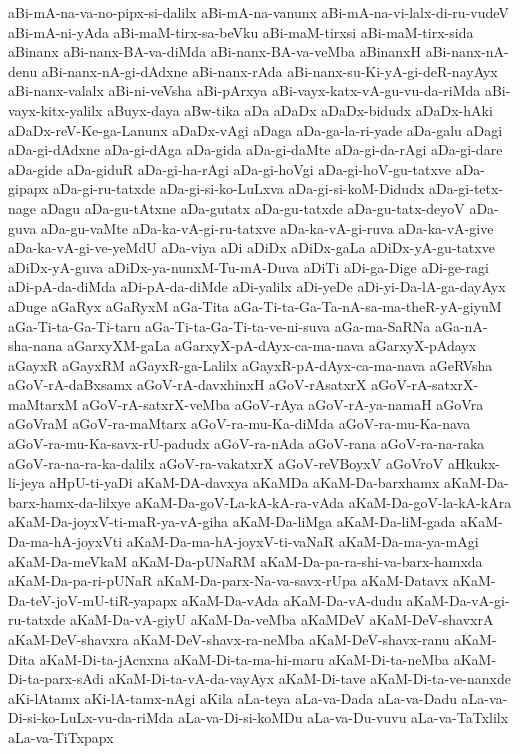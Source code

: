 {aBi-mA-na-va-no-pipx-si-dalilx
aBi-mA-na-vanunx
aBi-mA-na-vi-lalx-di-ru-vudeV
aBi-mA-ni-yAda
aBi-maM-tirx-sa-beVku
aBi-maM-tirxsi
aBi-maM-tirx-sida
aBinanx
aBi-nanx-BA-va-diMda
aBi-nanx-BA-va-veMba
aBinanxH
aBi-nanx-nA-denu
aBi-nanx-nA-gi-dAdxne
aBi-nanx-rAda
aBi-nanx-su-Ki-yA-gi-deR-nayAyx
aBi-nanx-valalx
aBi-ni-veVsha
aBi-pArxya
aBi-vayx-katx-vA-gu-vu-da-riMda
aBi-vayx-kitx-yalilx
aBuyx-daya
aBw-tika
aDa
aDaDx
aDaDx-bidudx
aDaDx-hAki
aDaDx-reV-Ke-ga-Lanunx
aDaDx-vAgi
aDaga
aDa-ga-la-ri-yade
aDa-galu
aDagi
aDa-gi-dAdxne
aDa-gi-dAga
aDa-gida
aDa-gi-daMte
aDa-gi-da-rAgi
aDa-gi-dare
aDa-gide
aDa-giduR
aDa-gi-ha-rAgi
aDa-gi-hoVgi
aDa-gi-hoV-gu-tatxve
aDa-gipapx
aDa-gi-ru-tatxde
aDa-gi-si-ko-LuLxva
aDa-gi-si-koM-Didudx
aDa-gi-tetx-nage
aDagu
aDa-gu-tAtxne
aDa-gutatx
aDa-gu-tatxde
aDa-gu-tatx-deyoV
aDa-guva
aDa-gu-vaMte
aDa-ka-vA-gi-ru-tatxve
aDa-ka-vA-gi-ruva
aDa-ka-vA-give
aDa-ka-vA-gi-ve-yeMdU
aDa-viya
aDi
aDiDx
aDiDx-gaLa
aDiDx-yA-gu-tatxve
aDiDx-yA-guva
aDiDx-ya-nunxM-Tu-mA-Duva
aDiTi
aDi-ga-Dige
aDi-ge-ragi
aDi-pA-da-diMda
aDi-pA-da-diMde
aDi-yalilx
aDi-yeDe
aDi-yi-Da-lA-ga-dayAyx
aDuge
aGaRyx
aGaRyxM
aGa-Tita
aGa-Ti-ta-Ga-Ta-nA-sa-ma-theR-yA-giyuM
aGa-Ti-ta-Ga-Ti-taru
aGa-Ti-ta-Ga-Ti-ta-ve-ni-suva
aGa-ma-SaRNa
aGa-nA-sha-nana
aGarxyXM-gaLa
aGarxyX-pA-dAyx-ca-ma-nava
aGarxyX-pAdayx
aGayxR
aGayxRM
aGayxR-ga-Lalilx
aGayxR-pA-dAyx-ca-ma-nava
aGeRVsha
aGoV-rA-daBxsamx
aGoV-rA-davxhinxH
aGoV-rAsatxrX
aGoV-rA-satxrX-maMtarxM
aGoV-rA-satxrX-veMba
aGoV-rAya
aGoV-rA-ya-namaH
aGoVra
aGoVraM
aGoV-ra-maMtarx
aGoV-ra-mu-Ka-diMda
aGoV-ra-mu-Ka-nava
aGoV-ra-mu-Ka-savx-rU-padudx
aGoV-ra-nAda
aGoV-rana
aGoV-ra-na-raka
aGoV-ra-na-ra-ka-dalilx
aGoV-ra-vakatxrX
aGoV-reVBoyxV
aGoVroV
aHkukx-li-jeya
aHpU-ti-yaDi
aKaM-DA-davxya
aKaMDa
aKaM-Da-barxhamx
aKaM-Da-barx-hamx-da-lilxye
aKaM-Da-goV-La-kA-kA-ra-vAda
aKaM-Da-goV-la-kA-kAra
aKaM-Da-joyxV-ti-maR-ya-vA-giha
aKaM-Da-liMga
aKaM-Da-liM-gada
aKaM-Da-ma-hA-joyxVti
aKaM-Da-ma-hA-joyxV-ti-vaNaR
aKaM-Da-ma-ya-mAgi
aKaM-Da-meVkaM
aKaM-Da-pUNaRM
aKaM-Da-pa-ra-shi-va-barx-hamxda
aKaM-Da-pa-ri-pUNaR
aKaM-Da-parx-Na-va-savx-rUpa
aKaM-Datavx
aKaM-Da-teV-joV-mU-tiR-yapapx
aKaM-Da-vAda
aKaM-Da-vA-dudu
aKaM-Da-vA-gi-ru-tatxde
aKaM-Da-vA-giyU
aKaM-Da-veMba
aKaMDeV
aKaM-DeV-shavxrA
aKaM-DeV-shavxra
aKaM-DeV-shavx-ra-neMba
aKaM-DeV-shavx-ranu
aKaM-Dita
aKaM-Di-ta-jAcnxna
aKaM-Di-ta-ma-hi-maru
aKaM-Di-ta-neMba
aKaM-Di-ta-parx-sAdi
aKaM-Di-ta-vA-da-vayAyx
aKaM-Di-tave
aKaM-Di-ta-ve-nanxde
aKi-lAtamx
aKi-lA-tamx-nAgi
aKila
aLa-teya
aLa-va-Dada
aLa-va-Dadu
aLa-va-Di-si-ko-LuLx-vu-da-riMda
aLa-va-Di-si-koMDu
aLa-va-Du-vuvu
aLa-va-TaTxlilx
aLa-va-TiTxpapx
}
